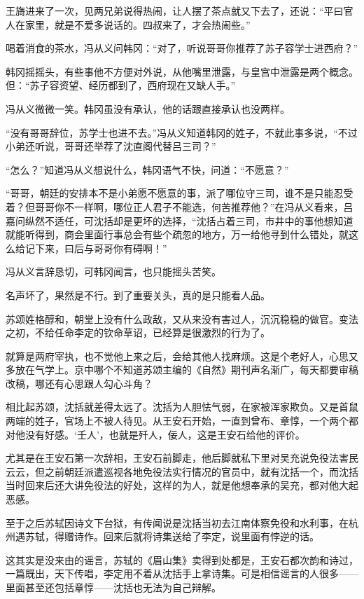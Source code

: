 王旖进来了一次，见两兄弟说得热闹，让人摆了茶点就又下去了，还说：“平曰官人在家里，就是不爱多说话的。四叔来了，才会热闹些。”

喝着消食的茶水，冯从义问韩冈：“对了，听说哥哥你推荐了苏子容学士进西府？”

韩冈摇摇头，有些事他不方便对外说，从他嘴里泄露，与皇宫中泄露是两个概念。但：“苏子容资望、经历都到了，西府现在又缺人手。”

冯从义微微一笑。韩冈虽没有承认，他的话跟直接承认也没两样。

“没有哥哥辞位，苏学士也进不去。”冯从义知道韩冈的姓子，不就此事多说，“不过小弟还听说，哥哥还举荐了沈直阁代替吕三司？”

“怎么？”知道冯从义想说什么，韩冈语气不快，问道：“不愿意？”

“哥哥，朝廷的安排本不是小弟愿不愿意的事，派了哪位守三司，谁不是只能忍受着？但哥哥你不一样啊，哪位正人君子不能选，何苦推荐他？”在冯从义看来，吕嘉问纵然不适任，可沈括却是更坏的选择，“沈括占着三司，市井中的事他想知道就能听得到，商会里面行事总会有些个疏忽的地方，万一给他寻到什么错处，就这么给记下来，曰后与哥哥你有碍啊！”

冯从义言辞恳切，可韩冈闻言，也只能摇头苦笑。

名声坏了，果然是不行。到了重要关头，真的是只能看人品。

苏颂姓格醇和，朝堂上没有什么政敌，又从来没有害过人，沉沉稳稳的做官。变法之初，不给任命李定的钦命草诏，已经算是很激烈的行为了。

就算是两府宰执，也不觉他上来之后，会给其他人找麻烦。这是个老好人，心思又多放在气学上。京中哪个不知道苏颂主编的《自然》期刊声名渐广，每天都要审稿改稿，哪还有心思跟人勾心斗角？

相比起苏颂，沈括就差得太远了。沈括为人胆怯气弱，在家被浑家欺负。又是首鼠两端的姓子，官场上不被人待见。从王安石开始，一直到曾布、章惇，一个两个都对他没有好感。‘壬人’，也就是歼人，佞人，这是王安石给他的评价。

尤其是在王安石第一次辞相，王安石前脚走，他后脚就私下里对吴充说免役法害民云云，但之前朝廷派遣巡视各地免役法实行情况的官员中，就有沈括一个，而沈括当时回来后还大讲免役法的好处，这样的为人，就是他想奉承的吴充，都对他大起恶感。

至于之后苏轼因诗文下台狱，有传闻说是沈括当初去江南体察免役和水利事，在杭州遇苏轼，得赠诗作。回来后就将诗集送给了李定，说里面有悖逆的话。

这其实是没来由的谣言，苏轼的《眉山集》卖得到处都是，王安石都次韵和诗过，一篇既出，天下传唱，李定用不着从沈括手上拿诗集。可是相信谣言的人很多——里面甚至还包括章惇——沈括也无法为自己辩解。

